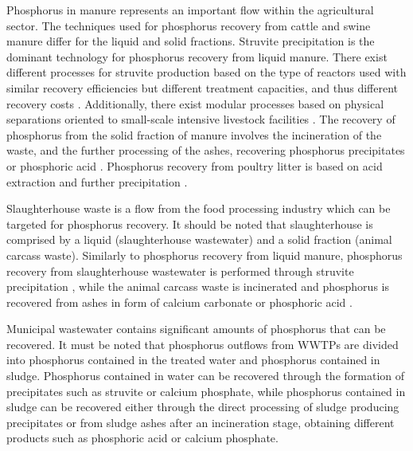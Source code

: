 \documentclass[]{elsarticle}
\begin{document}
Phosphorus in manure represents an important flow within the agricultural sector.
The techniques used for phosphorus recovery from cattle and swine manure differ for the liquid and solid fractions. Struvite precipitation is the dominant technology for phosphorus recovery from liquid manure. There exist different processes for struvite production based on the type of reactors used with similar recovery efficiencies but different treatment capacities, and thus different recovery costs \citep{martin2021geospatial}. Additionally, there exist modular processes based on physical separations oriented to small-scale intensive livestock facilities \citep{church_versatility_2018}. The recovery of phosphorus from the solid fraction of manure involves the incineration of the waste, and the further processing of the ashes, recovering phosphorus precipitates or phosphoric acid \citep{jupp2021phosphorus,egle_phosphorus_2016}. Phosphorus recovery from poultry litter is based on acid extraction and further precipitation \citep{szogi2008phosphorus}.

Slaughterhouse waste is a flow from the food processing industry which can be targeted for phosphorus recovery. It should be noted that slaughterhouse is comprised by a liquid (slaughterhouse wastewater) and a solid fraction (animal carcass waste).
Similarly to phosphorus recovery from liquid manure, phosphorus recovery from slaughterhouse wastewater is performed through struvite precipitation \citep{Pearl2Kcost2}, while the animal carcass waste is incinerated and phosphorus is recovered from ashes in form of calcium carbonate or phosphoric acid \citep{jupp2021phosphorus}.

Municipal wastewater contains significant amounts of phosphorus that can be recovered. It must be noted that phosphorus outflows from WWTPs are divided into phosphorus contained in the treated water and phosphorus contained in sludge. Phosphorus contained in water can be recovered through the formation of precipitates such as struvite or calcium phosphate, while phosphorus contained in sludge can be recovered either through the direct processing of sludge producing precipitates or from sludge ashes after an incineration stage, obtaining different products such as phosphoric acid or calcium phosphate.
\end{document}
